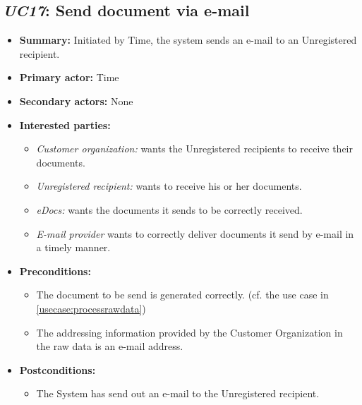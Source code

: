\documentclass[a4paper,10pt]{article}
\begin{document}
\subsection{\emph{UC17}: Send document via e-mail}
\label{usecase:senddocumentviaemail}
\begin{itemize}
    \item \textbf{Summary:} Initiated by Time, the system sends an e-mail to an Unregistered recipient.
    \item \textbf{Primary actor:} Time
	\item \textbf{Secondary actors:} None
    \item \textbf{Interested parties:} 
        \begin{itemize}
            \item \textit{Customer organization:} wants the Unregistered recipients to receive their documents.
            \item \textit{Unregistered recipient:} wants to receive his or her documents.
            \item \textit{eDocs:} wants the documents it sends to be correctly received.
            \item \textit{E-mail provider} wants to correctly deliver documents it send by e-mail in a timely manner.
        \end{itemize}

    \item \textbf{Preconditions:}
        \begin{itemize}
            \item The document to be send is generated correctly. (cf. the use case in \ref{usecase:processrawdata})
            \item The addressing information provided by the Customer Organization in the raw data is an e-mail address.
        \end{itemize}

    \item \textbf{Postconditions:}
        \begin{itemize}
            \item The System has send out an e-mail to the Unregistered recipient.
        \end{itemize}
        

\end{itemize}
\end{document}
